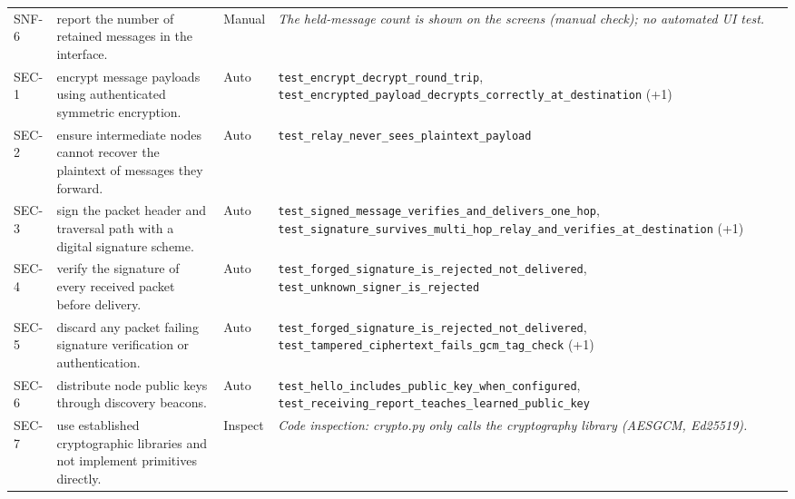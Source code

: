 \begin{longtable}{@{}p{0.95cm}p{6.6cm}p{1.15cm}p{8.6cm}@{}}
SNF-6 & report the number of retained messages in the interface. & Manual & \textit{The held-message count is shown on the screens (manual check); no automated UI test.} \\
SEC-1 & encrypt message payloads using authenticated symmetric encryption. & Auto & \texttt{test\_\allowbreak{}encrypt\_\allowbreak{}decrypt\_\allowbreak{}round\_\allowbreak{}trip}, \texttt{test\_\allowbreak{}encrypted\_\allowbreak{}payload\_\allowbreak{}decrypts\_\allowbreak{}correctly\_\allowbreak{}at\_\allowbreak{}destination} (+1) \\
SEC-2 & ensure intermediate nodes cannot recover the plaintext of messages they forward. & Auto & \texttt{test\_\allowbreak{}relay\_\allowbreak{}never\_\allowbreak{}sees\_\allowbreak{}plaintext\_\allowbreak{}payload} \\
SEC-3 & sign the packet header and traversal path with a digital signature scheme. & Auto & \texttt{test\_\allowbreak{}signed\_\allowbreak{}message\_\allowbreak{}verifies\_\allowbreak{}and\_\allowbreak{}delivers\_\allowbreak{}one\_\allowbreak{}hop}, \texttt{test\_\allowbreak{}signature\_\allowbreak{}survives\_\allowbreak{}multi\_\allowbreak{}hop\_\allowbreak{}relay\_\allowbreak{}and\_\allowbreak{}verifies\_\allowbreak{}at\_\allowbreak{}destination} (+1) \\
SEC-4 & verify the signature of every received packet before delivery. & Auto & \texttt{test\_\allowbreak{}forged\_\allowbreak{}signature\_\allowbreak{}is\_\allowbreak{}rejected\_\allowbreak{}not\_\allowbreak{}delivered}, \texttt{test\_\allowbreak{}unknown\_\allowbreak{}signer\_\allowbreak{}is\_\allowbreak{}rejected} \\
SEC-5 & discard any packet failing signature verification or authentication. & Auto & \texttt{test\_\allowbreak{}forged\_\allowbreak{}signature\_\allowbreak{}is\_\allowbreak{}rejected\_\allowbreak{}not\_\allowbreak{}delivered}, \texttt{test\_\allowbreak{}tampered\_\allowbreak{}ciphertext\_\allowbreak{}fails\_\allowbreak{}gcm\_\allowbreak{}tag\_\allowbreak{}check} (+1) \\
SEC-6 & distribute node public keys through discovery beacons. & Auto & \texttt{test\_\allowbreak{}hello\_\allowbreak{}includes\_\allowbreak{}public\_\allowbreak{}key\_\allowbreak{}when\_\allowbreak{}configured}, \texttt{test\_\allowbreak{}receiving\_\allowbreak{}report\_\allowbreak{}teaches\_\allowbreak{}learned\_\allowbreak{}public\_\allowbreak{}key} \\
SEC-7 & use established cryptographic libraries and not implement primitives directly. & Inspect & \textit{Code inspection: crypto.py only calls the cryptography library (AESGCM, Ed25519).} \\

\end{longtable}
